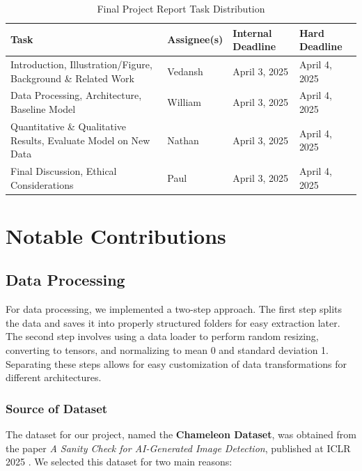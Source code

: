\documentclass{article} %
\begin{document}
\begin{table}[t]
    \caption{Final Project Report Task Distribution}
    \label{Final_Project_Report_Task_Distribution}
    \begin{center}
    \begin{tabularx}{\textwidth}{|>{\raggedright\arraybackslash}X|>{\raggedright\arraybackslash}X|>{\raggedright\arraybackslash}X|>{\raggedright\arraybackslash}X|}
    \hline
    \textbf{Task} & \textbf{Assignee(s)} & \textbf{Internal Deadline} & \textbf{Hard Deadline} \\
    \hline
    Introduction, Illustration/Figure, Background \& Related Work & Vedansh & April 3, 2025 & April 4, 2025 \\
    \hline
    Data Processing, Architecture, Baseline Model & William & April 3, 2025 & April 4, 2025 \\
    \hline
    Quantitative \& Qualitative Results, Evaluate Model on New Data & Nathan & April 3, 2025 & April 4, 2025 \\
    \hline
    Final Discussion, Ethical Considerations & Paul & April 3, 2025 & April 4, 2025 \\
    \hline
    \end{tabularx}
    \end{center}
    \end{table}



\section{Notable Contributions}
\subsection{Data Processing}

For data processing, we implemented a two-step approach. The first step splits the data and saves it into properly structured folders for easy extraction later. The second step involves using a data loader to perform random resizing, converting to tensors, and normalizing to mean 0 and standard deviation 1. Separating these steps allows for easy customization of data transformations for different architectures.

\subsubsection{Source of Dataset}
The dataset for our project, named the \textbf{Chameleon Dataset}, was obtained from the paper \emph{A Sanity Check for AI-Generated Image Detection}, published at ICLR 2025 \citep{yan2024sanity}. We selected this dataset for two main reasons:
\end{document}
